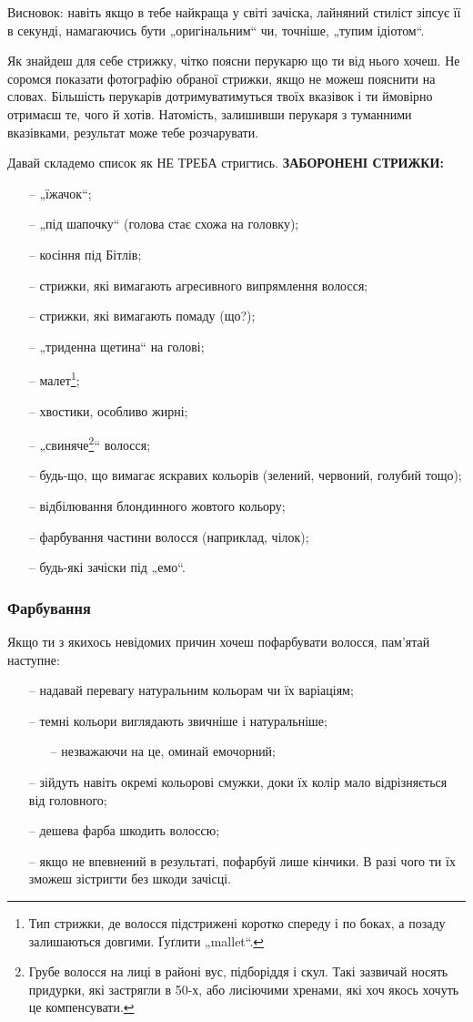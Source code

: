 Висновок: навіть якщо в тебе найкраща у світі зачіска, лайняний стиліст зіпсує
її в секунді, намагаючись бути „оригінальним“ чи, точніше, „тупим ідіотом“.

Як знайдеш для себе стрижку, чітко поясни перукарю що ти від нього хочеш. Не
соромся показати фотографію обраної стрижки, якщо не можеш пояснити на словах.
Більшість перукарів дотримуватимуться твоїх вказівок і ти ймовірно отримаєш те,
чого й хотів. Натомість, залишивши перукаря з туманними вказівками, результат
може тебе розчарувати.

Давай складемо список як НЕ ТРЕБА стригтись. \textbf{ЗАБОРОНЕНІ СТРИЖКИ:}
\begin{itemize}
	\item[--] „їжачок“;
	\item[--] „під шапочку“ (голова стає схожа на головку);
	\item[--] косіння під Бітлів;
	\item[--] стрижки, які вимагають агресивного випрямлення волосся;
	\item[--] стрижки, які вимагають помаду (що?);
	\item[--] „триденна щетина“ на голові;
	\item[--] малет\footnote{Тип стрижки, де волосся підстрижені коротко
	спереду і по боках, а позаду залишаються довгими. Ґуґлити „mallet“.};
	\item[--] хвостики, особливо жирні;
	\item[--] „свиняче\footnote{Грубе волосся на лиці в районі вус, підборіддя
	і скул. Такі зазвичай носять придурки, які застрягли в 50-х, або лисіючими
	хренами, які хоч якось хочуть це компенсувати.}“ волосся;
	\item[--] будь-що, що вимагає яскравих кольорів (зелений, червоний, голубий
	тощо);
	\item[--] відбілювання блондинного жовтого кольору;
	\item[--] фарбування частини волосся (наприклад, чілок);
	\item[--] будь-які зачіски під „емо“.
\end{itemize}

\subsubsection{Фарбування}
Якщо ти з якихось невідомих причин хочеш пофарбувати волосся, пам’ятай
наступне:
\begin{itemize}
	\item[--] надавай перевагу натуральним кольорам чи їх варіаціям;
	\item[--] темні кольори виглядають звичніше і натуральніше;
	\begin{itemize}
		\item[--] незважаючи на це, оминай емочорний;
	\end{itemize}
	\item[--] зійдуть навіть окремі кольорові смужки, доки їх колір мало
	відрізняється від головного;
	\item[--] дешева фарба шкодить волоссю;
	\item[--] якщо не впевнений в результаті, пофарбуй лише кінчики. В разі
	чого ти їх зможеш зістригти без шкоди зачісці.
\end{itemize}